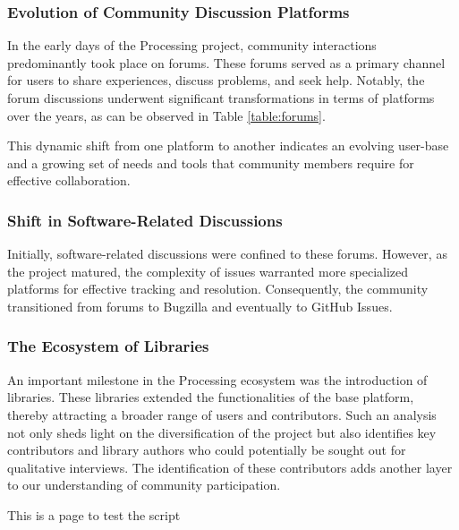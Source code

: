 \subsubsection*{Evolution of Community Discussion Platforms}
In the early days of the Processing project, community interactions predominantly took place on forums. These forums served as a primary channel for users to share experiences, discuss problems, and seek help. Notably, the forum discussions underwent significant transformations in terms of platforms over the years, as can be observed in Table \ref{table:forums}. \parencite{ProcessingForum}



This dynamic shift from one platform to another indicates an evolving user-base and a growing set of needs and tools that community members require for effective collaboration.

\subsubsection*{Shift in Software-Related Discussions}

Initially, software-related discussions were confined to these forums. However, as the project matured, the complexity of issues warranted more specialized platforms for effective tracking and resolution. Consequently, the community transitioned from forums to Bugzilla \parencite{BugzillaArchiveProcessing} and eventually to GitHub Issues\parencite{ProcessingProcessingSource}\parencite{ProcessingProcessing4Processing}. 

\subsubsection*{The Ecosystem of Libraries}
An important milestone in the Processing ecosystem was the introduction of libraries. These libraries extended the functionalities of the base platform, thereby attracting a broader range of users and contributors. Such an analysis not only sheds light on the diversification of the project but also identifies key contributors and library authors who could potentially be sought out for qualitative interviews. The identification of these contributors adds another layer to our understanding of community participation.

\newpage
This is a page to test the script

\changepapersize{305.3mm:210mm}

